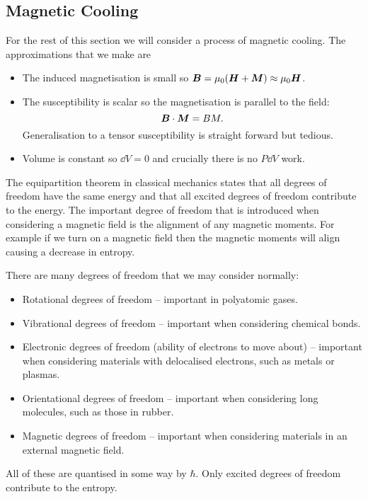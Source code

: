 \documentclass[a4paper]{article}
\begin{document}
    \subsection{Magnetic Cooling}
    For the rest of this section we will consider a process of magnetic cooling.
    The approximations that we make are
    \begin{itemize}
        \item The induced magnetisation is small so \(\bm{B} = \mu_0(\bm{H} + \bm{M}) \approx \mu_0\bm{H}\).
        \item The susceptibility is scalar so the magnetisation is parallel to the field:
        \[\bm{B}\cdot\bm{M} = BM.\]
        Generalisation to a tensor susceptibility is straight forward but tedious.
        \item Volume is constant so \(\dd{V} = 0\) and crucially there is no \(P\dd{V}\) work.
    \end{itemize}
    The equipartition theorem in classical mechanics states that all degrees of freedom have the same energy and that all excited degrees of freedom contribute to the energy.
    The important degree of freedom that is introduced when considering a magnetic field is the alignment of any magnetic moments.
    For example if we turn on a magnetic field then the magnetic moments will align causing a decrease in entropy.
    
    There are many degrees of freedom that we may consider normally:
    \begin{itemize}
        \item Rotational degrees of freedom -- important in polyatomic gases.
        \item Vibrational degrees of freedom -- important when considering chemical bonds.
        \item Electronic degrees of freedom (ability of electrons to move about) -- important when considering materials with delocalised electrons, such as metals or plasmas.
        \item Orientational degrees of freedom -- important when considering long molecules, such as those in rubber.
        \item Magnetic degrees of freedom -- important when considering materials in an external magnetic field.
    \end{itemize}
    All of these are quantised in some way by \(\hbar\).
    Only excited degrees of freedom contribute to the entropy.
    
\end{document}
